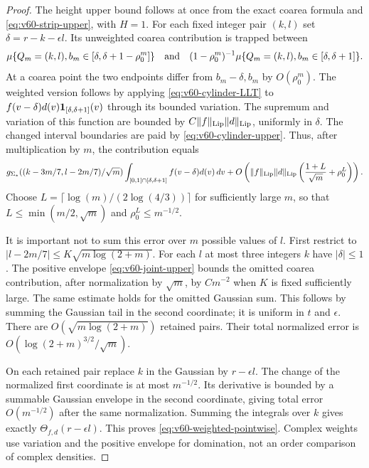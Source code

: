 \begin{proof}
The height upper bound follows at once from the exact coarea formula
and \eqref{eq:v60-strip-upper}, with $H=1$. For each fixed integer
pair $(k,l)$ set $\delta=r-k-\epsilon l$. Its unweighted coarea
contribution is trapped between
\[
 \mu\{Q_m=(k,l),b_m\in[\delta,\delta+1-\rho_0^m]\}
 \quad\hbox{and}\quad
 (1-\rho_0^m)^{-1}
 \mu\{Q_m=(k,l),b_m\in[\delta,\delta+1]\}.
\]
At a coarea point the two endpoints differ from $b_m-\delta,b_m$ by
$O(\rho_0^m)$. The weighted version follows by applying
\eqref{eq:v60-cylinder-LLT} to
$f(v-\delta)d(v)\mathbf1_{[\delta,\delta+1]}(v)$ through its bounded
variation. The supremum and variation of this function are bounded by
$C\|f\|_{\rm Lip}\|d\|_{\rm Lip}$, uniformly in $\delta$.
The changed interval boundaries are paid by
\eqref{eq:v60-cylinder-upper}. Thus, after multiplication by $m$,
the contribution equals
\[
 g_{\Sigma_*}((k-3m/7,l-2m/7)/\sqrt m)
 \int_{[0,1]\cap[\delta,\delta+1]} f(v-\delta)d(v)\,dv
 +O\left(\|f\|_{\rm Lip}\|d\|_{\rm Lip}
                \left(\frac{1+L}{\sqrt m}+\rho_0^L\right)\right).
\]
Choose $L=\lceil\log(m)/(2\log(4/3))\rceil$ for sufficiently large
$m$, so that $L\le\min(m/2,\sqrt m)$ and $\rho_0^L\le m^{-1/2}$.

It is important not to sum this error over $m$ possible values of $l$.
First restrict to $|l-2m/7|\le K\sqrt{m\log(2+m)}$.
For each $l$ at most three integers $k$ have $|\delta|\le1$.
The positive envelope \eqref{eq:v60-joint-upper} bounds the omitted
coarea contribution, after normalization by $\sqrt m$, by $Cm^{-2}$
when $K$ is fixed sufficiently large. The same estimate holds for
the omitted Gaussian sum. This follows by summing the Gaussian tail
in the second coordinate; it is uniform in $t$ and $\epsilon$.
There are $O(\sqrt{m\log(2+m)})$ retained pairs. Their total normalized
error is $O(\log(2+m)^{3/2}/\sqrt m)$.

On each retained pair replace $k$ in the Gaussian by $r-\epsilon l$.
The change of the normalized first coordinate is at most $m^{-1/2}$.
Its derivative is bounded by a summable Gaussian envelope in the second
coordinate, giving total error $O(m^{-1/2})$ after the same normalization.
Summing the integrals over $k$ gives exactly $\Theta_{f,d}(r-\epsilon l)$.
This proves \eqref{eq:v60-weighted-pointwise}. Complex weights use
variation and the positive envelope for domination, not an order
comparison of complex densities.


\end{proof}
